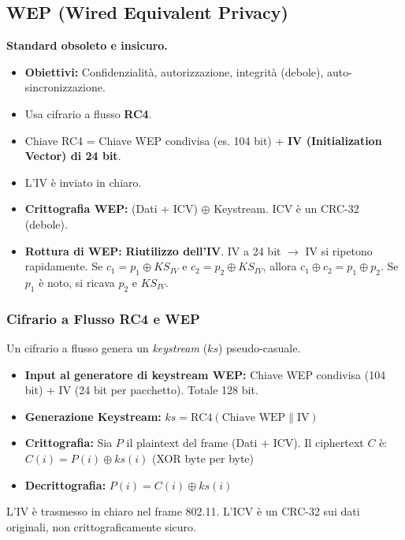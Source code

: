 \subsection{WEP (Wired Equivalent Privacy)}
\textbf{Standard obsoleto e insicuro.}
\begin{itemize}
    \item \textbf{Obiettivi:} Confidenzialità, autorizzazione, integrità (debole), auto-sincronizzazione.
    \item Usa cifrario a flusso \textbf{RC4}.
    \item Chiave RC4 = Chiave WEP condivisa (es. 104 bit) + \textbf{IV (Initialization Vector) di 24 bit}.
    \item L'IV è inviato in chiaro.
    \item \textbf{Crittografia WEP:} (Dati + ICV) $\oplus$ Keystream. ICV è un CRC-32 (debole).
    \item \textbf{Rottura di WEP:} \textbf{Riutilizzo dell'IV}. IV a 24 bit $\rightarrow$ IV si ripetono rapidamente.
    Se $c_1 = p_1 \oplus KS_{IV}$ e $c_2 = p_2 \oplus KS_{IV}$, allora $c_1 \oplus c_2 = p_1 \oplus p_2$.
    Se $p_1$ è noto, si ricava $p_2$ e $KS_{IV}$.
\end{itemize}

\subsubsection{Cifrario a Flusso RC4 e WEP}
\label{ssubsec:wep_rc4_stream}
Un cifrario a flusso genera un \textit{keystream} ($ks$) pseudo-casuale.
\begin{itemize}
    \item \textbf{Input al generatore di keystream WEP:} Chiave WEP condivisa (104 bit) + IV (24 bit per pacchetto). Totale 128 bit.
    \item \textbf{Generazione Keystream:} $ks = \text{RC4}(\text{Chiave WEP} \mathbin{\|} \text{IV})$
    \item \textbf{Crittografia:} Sia $P$ il plaintext del frame (Dati + ICV). Il ciphertext $C$ è:
    $C(i) = P(i) \oplus ks(i)$ (XOR byte per byte)
    \item \textbf{Decrittografia:} $P(i) = C(i) \oplus ks(i)$
\end{itemize}
L'IV è trasmesso in chiaro nel frame 802.11. L'ICV è un CRC-32 sui dati originali, non crittograficamente sicuro.

